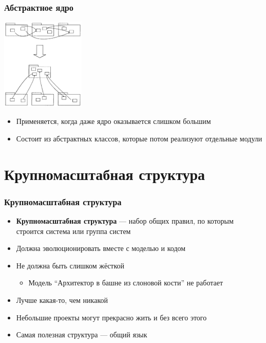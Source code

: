 \documentclass[xetex,mathserif,serif]{beamer}
\begin{document}
	\begin{frame}
		\frametitle{Абстрактное ядро}
		\begin{center}
			\includegraphics[width=0.3\textwidth]{abstractCore.png}
		\end{center}
		\begin{itemize}
			\item Применяется, когда даже ядро оказывается слишком большим
			\item Состоит из абстрактных классов, которые потом реализуют отдельные модули
		\end{itemize}
	\end{frame}
	
	\section{Крупномасштабная структура}

	\begin{frame}
		\frametitle{Крупномасштабная структура}
		\begin{itemize}
			\item \textbf{Крупномасштабная структура} --- набор общих правил, по которым строится система или группа систем
			\item Должна эволюционировать вместе с моделью и кодом
			\item Не должна быть слишком жёсткой
			\begin{itemize}
				\item Модель ``Архитектор в башне из слоновой кости'' не работает
			\end{itemize}
			\item Лучше какая-то, чем никакой
			\item Небольшие проекты могут прекрасно жить и без всего этого
			\item Самая полезная структура --- общий язык
		\end{itemize}
	\end{frame}
\end{document}

